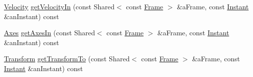 \begin{DoxyCompactItemize}
\item 
\hyperlink{classlibrary_1_1physics_1_1coord_1_1_velocity}{Velocity} \hyperlink{classlibrary_1_1physics_1_1coord_1_1_frame_ae7974e759c97f32ccc966cbcc3baf77c}{get\+Velocity\+In} (const Shared$<$ const \hyperlink{classlibrary_1_1physics_1_1coord_1_1_frame}{Frame} $>$ \&a\+Frame, const \hyperlink{classlibrary_1_1physics_1_1time_1_1_instant}{Instant} \&an\+Instant) const
\item 
\hyperlink{classlibrary_1_1physics_1_1coord_1_1_axes}{Axes} \hyperlink{classlibrary_1_1physics_1_1coord_1_1_frame_abd6fc9109e37433d4b223cfb291edb20}{get\+Axes\+In} (const Shared$<$ const \hyperlink{classlibrary_1_1physics_1_1coord_1_1_frame}{Frame} $>$ \&a\+Frame, const \hyperlink{classlibrary_1_1physics_1_1time_1_1_instant}{Instant} \&an\+Instant) const
\item 
\hyperlink{classlibrary_1_1physics_1_1coord_1_1_transform}{Transform} \hyperlink{classlibrary_1_1physics_1_1coord_1_1_frame_a567715e72b885f8c7ec0ab7a3d068240}{get\+Transform\+To} (const Shared$<$ const \hyperlink{classlibrary_1_1physics_1_1coord_1_1_frame}{Frame} $>$ \&a\+Frame, const \hyperlink{classlibrary_1_1physics_1_1time_1_1_instant}{Instant} \&an\+Instant) const
\end{DoxyCompactItemize}
